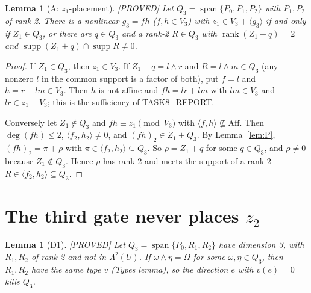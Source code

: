 \documentclass[11pt,a4paper]{article}
\theoremstyle{plain}
\newtheorem{lemma}[theorem]{Lemma}
\theoremstyle{definition}
\theoremstyle{remark}
\newcommand{\Aff}{\mathrm{Aff}}
\newcommand{\Span}{\operatorname{span}}
\newcommand{\supp}{\operatorname{supp}}
\newcommand{\rk}{\operatorname{rank}}
\newcommand{\Lam}{\Lambda^{2}}
\newcommand{\status}[1]{\hfill\textsf{[#1]}}
\begin{document}
\begin{lemma}[A: $z_1$-placement]\label{lem:A}\status{PROVED}
Let $Q_3=\Span\{P_0,P_1,P_2\}$ with $P_1,P_2$ of rank 2. There is a nonlinear $g_3=fh$ ($f,h\in V_3$) with $z_1\in V_3+\langle g_3\rangle$ if and only if $Z_1\in Q_3$, or there are $q\in Q_3$ and a rank-2 $R\in Q_3$ with $\rk(Z_1+q)=2$ and $\supp(Z_1+q)\cap\supp R\neq0$.
\end{lemma}

\begin{proof}
If $Z_1\in Q_3$, then $z_1\in V_3$. If $Z_1+q=l\wedge r$ and $R=l\wedge m\in Q_3$ (any nonzero $l$ in the common support is a factor of both), put $f=l$ and $h=r+lm\in V_3$. Then $h$ is not affine and $fh=lr+lm$ with $lm\in V_3$ and $lr\in z_1+V_3$; this is the sufficiency of TASK8\_REPORT.

Conversely let $Z_1\notin Q_3$ and $fh\equiv z_1\pmod{V_3}$ with $\langle f,h\rangle\not\subseteq\Aff$. Then $\deg(fh)\le2$, $\langle f_2,h_2\rangle\neq0$, and $(fh)_2\in Z_1+Q_3$. By Lemma~\ref{lem:P}, $(fh)_2=\pi+\rho$ with $\pi\in\langle f_2,h_2\rangle\subseteq Q_3$. So $\rho=Z_1+q$ for some $q\in Q_3$, and $\rho\neq0$ because $Z_1\notin Q_3$. Hence $\rho$ has rank 2 and meets the support of a rank-2 $R\in\langle f_2,h_2\rangle\subseteq Q_3$.
\end{proof}

\section{The third gate never places $z_2$}

\begin{lemma}[D1]\label{lem:D1}\status{PROVED}
Let $Q_3=\Span\{P_0,R_1,R_2\}$ have dimension 3, with $R_1,R_2$ of rank 2 and not in $\Lam(U)$. If $\omega\wedge\eta=\Omega$ for some $\omega,\eta\in Q_3$, then $R_1,R_2$ have the same type $v$ (Types lemma), so the direction $e$ with $v(e)=0$ kills $Q_3$.
\end{lemma}
\end{document}
